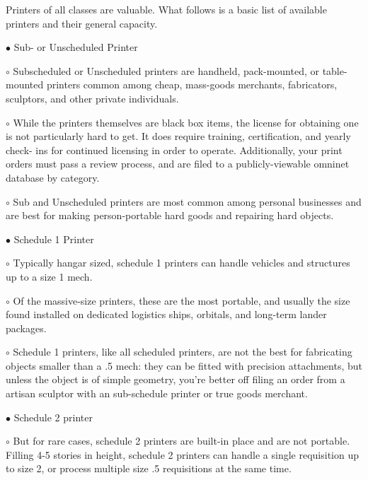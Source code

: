 Printers of all classes are valuable. What follows is a basic list of available printers and their  
general capacity.
 

    $\bullet$    Sub- or Unscheduled Printer
 
             $\circ$     Subscheduled or Unscheduled printers are handheld, pack-mounted, or table- 
                 mounted printers common among cheap, mass-goods merchants, fabricators,  
                 sculptors, and other private individuals. 
 

                                                                                                           


         $\circ$     While the printers themselves are black box items, the license for obtaining one is  
             not particularly hard to get. It does require training, certification, and yearly check- 
             ins for continued licensing in order to operate. Additionally, your print orders must  
             pass a review process, and are filed to a publicly-viewable omninet database by  
             category. 
 
         $\circ$     Sub and Unscheduled printers are most common among personal businesses and  
             are best for making person-portable hard goods and repairing hard objects. 
 
$\bullet$    Schedule 1 Printer
 
         $\circ$     Typically hangar sized, schedule 1 printers can handle vehicles and structures up  
             to a size 1 mech.
 
         $\circ$     Of the massive-size printers, these are the most portable, and usually the size  
             found installed on dedicated logistics ships, orbitals, and long-term lander  
             packages. 
 
         $\circ$     Schedule 1 printers, like all scheduled printers, are not the best for fabricating  
             objects smaller than a .5 mech: they can be fitted with precision attachments, but  
             unless the object is of simple geometry, you’re better off filing an order from a  
             artisan sculptor with an sub-schedule printer or true goods merchant.  
 
              
 
$\bullet$    Schedule 2 printer
 
         $\circ$     But for rare cases, schedule 2 printers are built-in place and are not portable.  
             Filling 4-5 stories in height, schedule 2 printers can handle a single requisition up  
             to size 2, or process multiple size .5 requisitions at the same time. 
 
